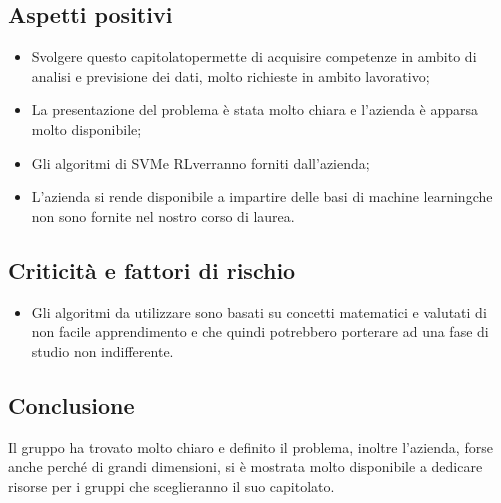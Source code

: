\subsection{Aspetti positivi}
\begin{itemize} 
	\item Svolgere questo capitolato\glosp permette di acquisire competenze in ambito di analisi e previsione dei dati, molto richieste in ambito lavorativo;
	\item La presentazione del problema è stata molto chiara e l'azienda è apparsa molto disponibile;
	\item Gli algoritmi di SVM\glosp e RL\glosp verranno forniti dall'azienda;
    \item L'azienda si rende disponibile a impartire delle basi di machine learning\glosp che non sono fornite nel nostro corso di laurea.
\end{itemize}
\subsection{Criticità e fattori di rischio}
\begin{itemize}
	\item Gli algoritmi da utilizzare sono basati su concetti matematici e valutati di non facile apprendimento e che quindi potrebbero porterare ad una fase di studio non indifferente. 
\end{itemize}
\subsection{Conclusione}
Il gruppo ha trovato molto chiaro e definito il problema, inoltre l'azienda, forse anche perché di grandi dimensioni, si è mostrata molto disponibile a dedicare risorse per i gruppi che sceglieranno il suo capitolato\glo.
